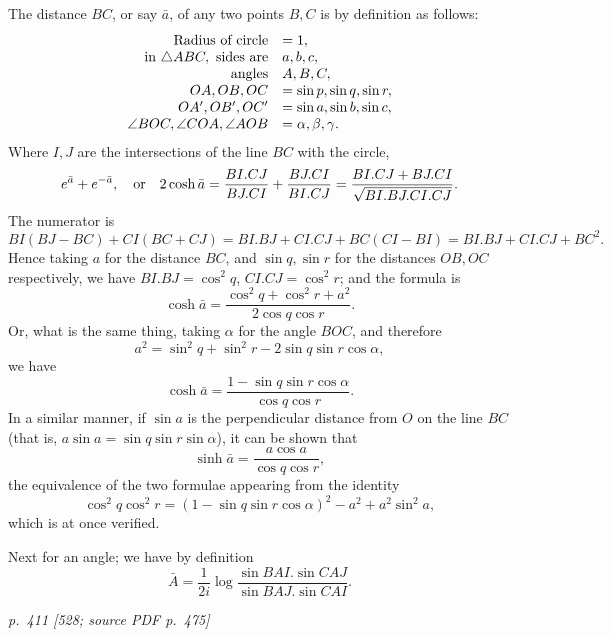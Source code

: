 \documentclass[11pt,a4paper]{article}
\newcommand{\pagemarker}[3]{\par\bigskip\noindent\textit{p.~#1 [#2; source PDF p.~#3]}\par\smallskip}
\begin{document}
The distance $BC$, or say $\bar a$, of any two points $B,C$ is by definition as follows:
\[
\begin{array}{rl}
\hbox{Radius of circle}&=1,\\
\hbox{in }\triangle ABC,\ \hbox{sides are}&a,b,c,\\
\hbox{angles}&A,B,C,\\
OA,OB,OC&=\sin p,\sin q,\sin r,\\
OA',OB',OC'&=\sin a,\sin b,\sin c,\\
\angle BOC,\angle COA,\angle AOB&=\alpha,\beta,\gamma.
\end{array}
\]
Where $I,J$ are the intersections of the line $BC$ with the circle,
\[
e^{\bar a}+e^{-\bar a},\quad\hbox{or}\quad
2\cosh\bar a=\frac{BI.CJ}{BJ.CI}+\frac{BJ.CI}{BI.CJ}
=\frac{BI.CJ+BJ.CI}{\sqrt{BI.BJ.CI.CJ}}.
\]
The numerator is
\[
BI(BJ-BC)+CI(BC+CJ)=BI.BJ+CI.CJ+BC(CI-BI)=BI.BJ+CI.CJ+BC^2.
\]
Hence taking $a$ for the distance $BC$, and $\sin q,\sin r$ for the distances
$OB,OC$ respectively, we have $BI.BJ=\cos^2q$, $CI.CJ=\cos^2r$; and the formula is
\[
\cosh\bar a=\frac{\cos^2q+\cos^2r+a^2}{2\cos q\cos r}.
\]
Or, what is the same thing, taking $\alpha$ for the angle $BOC$, and therefore
\[
a^2=\sin^2q+\sin^2r-2\sin q\sin r\cos\alpha,
\]
we have
\[
\cosh\bar a=\frac{1-\sin q\sin r\cos\alpha}{\cos q\cos r}.
\]
In a similar manner, if $\sin a$ is the perpendicular distance from $O$ on the line
$BC$ (that is, $a\sin a=\sin q\sin r\sin\alpha$), it can be shown that
\[
\sinh\bar a=\frac{a\cos a}{\cos q\cos r},
\]
the equivalence of the two formulae appearing from the identity
\[
\cos^2q\cos^2r=(1-\sin q\sin r\cos\alpha)^2-a^2+a^2\sin^2a,
\]
which is at once verified.

Next for an angle; we have by definition
\[
\bar A=\frac1{2i}\log\frac{\sin BAI.\sin CAJ}{\sin BAJ.\sin CAI}.
\]

\pagemarker{411}{528}{475}
\end{document}
